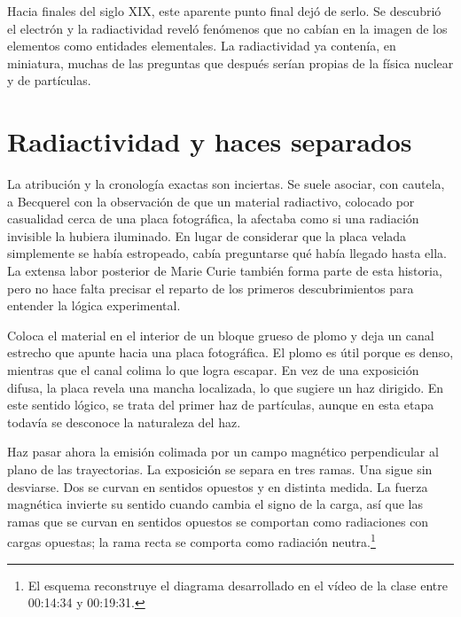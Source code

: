Hacia finales del siglo XIX, este aparente punto final dejó de serlo. Se descubrió el electrón y la radiactividad reveló fenómenos que no cabían en la imagen de los elementos como entidades elementales. La radiactividad ya contenía, en miniatura, muchas de las preguntas que después serían propias de la física nuclear y de partículas.

\section{Radiactividad y haces separados}

La atribución y la cronología exactas son inciertas. Se suele asociar, con cautela, a Becquerel con la observación de que un material radiactivo, colocado por casualidad cerca de una placa fotográfica, la afectaba como si una radiación invisible la hubiera iluminado. En lugar de considerar que la placa velada simplemente se había estropeado, cabía preguntarse qué había llegado hasta ella. La extensa labor posterior de Marie Curie también forma parte de esta historia, pero no hace falta precisar el reparto de los primeros descubrimientos para entender la lógica experimental.

Coloca el material en el interior de un bloque grueso de plomo y deja un canal estrecho que apunte hacia una placa fotográfica. El plomo es útil porque es denso, mientras que el canal colima lo que logra escapar. En vez de una exposición difusa, la placa revela una mancha localizada, lo que sugiere un haz dirigido. En este sentido lógico, se trata del primer haz de partículas, aunque en esta etapa todavía se desconoce la naturaleza del haz.

Haz pasar ahora la emisión colimada por un campo magnético perpendicular al plano de las trayectorias. La exposición se separa en tres ramas. Una sigue sin desviarse. Dos se curvan en sentidos opuestos y en distinta medida. La fuerza magnética invierte su sentido cuando cambia el signo de la carga, así que las ramas que se curvan en sentidos opuestos se comportan como radiaciones con cargas opuestas; la rama recta se comporta como radiación neutra.\footnote{El esquema reconstruye el diagrama desarrollado en el vídeo de la clase entre 00:14:34 y 00:19:31.}

